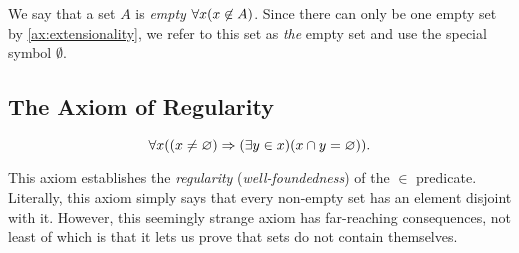 \begin{definition}
    We say that a set \(A\) is \emph{empty} \iffbydefn \(\forall x \pn*{x \not \in A}\).
    Since there can only be one empty set by \autoref{ax:extensionality},
    we refer to this set as \emph{the} empty set and use the special symbol \(\emptyset\).
\end{definition}

\subsection{The Axiom of Regularity}
\begin{axiom}[Regularity]\label{ax:regularity}
    \vspace{-\abovedisplayskip}
    \[
        \forall x \pn*{\pn*{x \neq \emptyset} \implies \pn*{\exists y \in x}\pn*{x \intersect y = \emptyset}}.
    \]

    This axiom establishes the \emph{regularity} (\aka \emph{well-foundedness}) of the \(\in\) predicate.
    Literally, this axiom simply says that every non-empty set has an element disjoint with it.
    However, this seemingly strange axiom has far-reaching consequences,
    not least of which is that it lets us prove that sets do not contain themselves.
\end{axiom}

